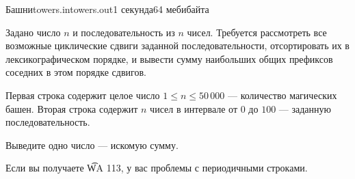 \begin{problem}{Башни}{towers.in}{towers.out}{1 секунда}{64 мебибайта}

Задано число $n$ и последовательность из $n$ чисел.
Требуется рассмотреть все возможные циклические сдвиги заданной последовательности,
отсортировать их в лексикографическом порядке,
и вывести сумму наибольших общих префиксов соседних в этом порядке сдвигов.

\InputFile

Первая строка содержит целое число $1 \le n \le 50\,000$ ---
количество магических башен.
Вторая строка содержит $n$ чисел в интервале от $0$ до $100$ --- 
заданную последовательность.

\OutputFile

Выведите одно число --- искомую сумму.

\Example

\begin{example}
%
\end{example}

\Hint

Если вы получаете \t{WA 113}, у вас проблемы с периодичными строками.

\end{problem}
